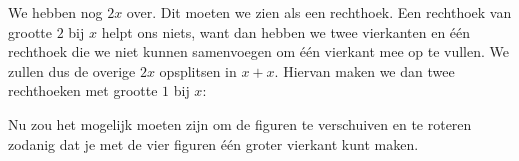 We hebben nog $2x$ over. Dit moeten we zien als een rechthoek. Een rechthoek van grootte $2$ bij $x$ helpt ons niets, want dan hebben we twee vierkanten en \'e\'en rechthoek die we niet kunnen samenvoegen om \'e\'en vierkant mee op te vullen. We zullen dus de overige $2x$ opsplitsen in $x + x$. Hiervan maken we dan twee rechthoeken met grootte $1$ bij $x$:

\begin{center}

\end{center}

Nu zou het mogelijk moeten zijn om de figuren te verschuiven en te roteren zodanig dat je met de vier figuren \'e\'en groter vierkant kunt maken.


\answer[5cm]{
\begin{center}

\end{center}
}


